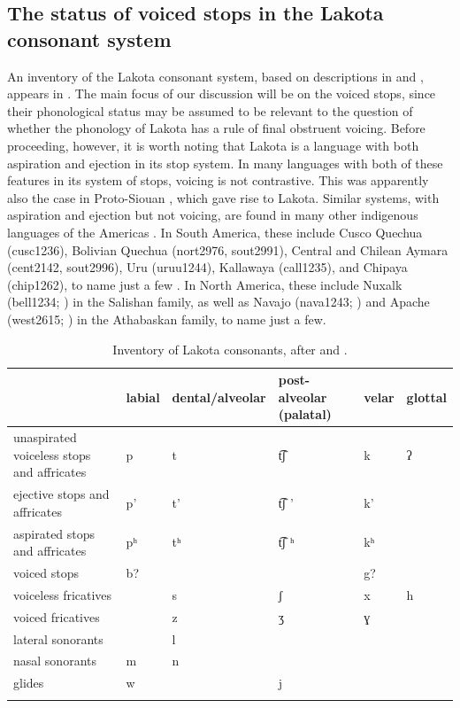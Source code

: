 \documentclass[output=paper]{langscibook}
\begin{document}
\subsection{The status of voiced stops in the Lakota consonant system} 
\label{sec:schwartz:2.2}

An inventory of the Lakota consonant system, based on descriptions in \citet[299]{BlevinsEtAl2020} and \citet{Rood2016}, appears in . The main focus of our discussion will be on the voiced stops, since their phonological status may be assumed to be relevant to the question of whether the phonology of Lakota has a rule of final obstruent voicing. Before proceeding, however, it is worth noting that Lakota is a language with both aspiration and ejection in its stop system. In many languages with both of these features in its system of stops, voicing is not contrastive. This was apparently also the case in Proto-Siouan \citep{RankinEtAl1998}, which gave rise to Lakota. Similar systems, with aspiration and ejection but not voicing, are found in many other indigenous languages of the Americas \citep{Maddieson1984}. In South America, these include Cusco Quechua (cusc1236), Bolivian Quechua (nort2976, sout2991), Central and Chilean Aymara (cent2142, sout2996), Uru (uruu1244), Kallawaya (call1235), and Chipaya (chip1262), to name just a few \citep{LevEtAl2015}. In North America, these include Nuxalk (bell1234; \citealt{Nater1984}) in the Salishan family, as well as Navajo (nava1243; \citealt{McDonoughLadefoged1993}) and Apache (west2615; \citealt{GordonEtAl2001}) in the Athabaskan family, to name just a few.


\begin{table}
\caption{\label{extab:schwartz:2}Inventory of Lakota consonants, after \citealt{Rood2016} and \citealt{BlevinsEtAl2020}.}
  \begin{tabularx}{\textwidth}{Qlllll}
  \lsptoprule
  & labial & dental/alveolar & post-alveolar (palatal) & velar & glottal\\
  \midrule
  unaspirated voiceless stops and affricates & p & t & t͡ʃ  & k & ʔ\\
  ejective stops and affricates & p’ & t’ & t͡ʃ ’  & k’ & \\
  aspirated stops and affricates & pʰ & tʰ & t͡ʃ ʰ  & kʰ & \\
  voiced stops & b? &  &  &  g? & \\
  voiceless fricatives &  &  s &  ʃ &  x  &  h\\
  voiced fricatives &  &  z &  ʒ &  ɣ  & \\
  lateral sonorants &  &  l &  &  & \\
  nasal sonorants &  m &  n &  &  & \\
  glides &  w &  &  j  &  & \\
  \lspbottomrule
  \end{tabularx}
\end{table}
\end{document}
